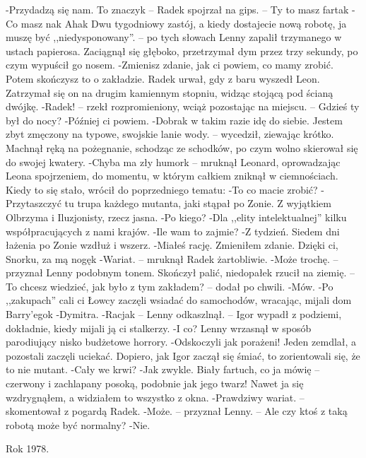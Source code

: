\documentclass[../MAIN.tex]{subfiles}
\begin{document}
-Przydadzą się nam. To znaczy\3k -- Radek spojrzał na gips. -- Ty to masz farta\3k
-Co masz na\3k Aha\3k Dwu tygodniowy zastój, a kiedy dostajecie nową robotę, ja muszę być ,,niedysponowany''. -- po tych słowach Lenny zapalił trzymanego w ustach papierosa. Zaciągnął się głęboko, przetrzymał dym przez trzy sekundy, po czym wypuścił go nosem.
-Zmienisz zdanie, jak ci powiem, co mamy zrobić. Potem skończysz to o zakładzie.
Radek urwał, gdy z baru wyszedł Leon. Zatrzymał się on na drugim kamiennym stopniu, widząc stojącą pod ścianą dwójkę.
-Radek! -- rzekł rozpromieniony, wciąż pozostając na miejscu. -- Gdzieś ty był do nocy?
-Później ci powiem.
-Dobra\3k w takim razie idę do siebie. Jestem zbyt zmęczony na typowe, swojskie lanie wody. -- wycedził, ziewając krótko. Machnął ręką na pożegnanie, schodząc ze schodków, po czym wolno skierował się do swojej kwatery.
-Chyba ma zły humor\3k -- mruknął Leonard, oprowadzając Leona spojrzeniem, do momentu, w którym całkiem zniknął w ciemnościach. Kiedy to się stało, wrócił do poprzedniego tematu:
-To co macie zrobić?
-Przytaszczyć tu trupa każdego mutanta, jaki stąpał po Zonie. Z wyjątkiem Olbrzyma i Iluzjonisty, rzecz jasna.
-Po kiego?
-Dla ,,elity intelektualnej'' kilku współpracujących z nami krajów.
-Ile wam to zajmie?
-Z tydzień. Siedem dni łażenia po Zonie wzdłuż i wszerz.
-Miałeś rację. Zmieniłem zdanie. Dzięki ci, Snorku, za mą nogę\3k
-Wariat. -- mruknął Radek żartobliwie.
-Może trochę. -- przyznał Lenny podobnym tonem. Skończył palić, niedopałek rzucił na ziemię. -- To chcesz wiedzieć, jak było z tym zakładem? -- dodał po chwili.
-Mów.
-Po ,,zakupach'' cali ci Łowcy zaczęli wsiadać do samochodów, wracając, mijali dom Barry’ego\3k
-Dymitra.
-Racja\3k -- Lenny odkaszlnął. -- Igor wypadł z podziemi, dokładnie, kiedy mijali ją ci stalkerzy.
-I co?
Lenny wrzasnął w sposób parodiujący nisko budżetowe horrory.
-Odskoczyli jak porażeni! Jeden zemdlał, a pozostali zaczęli uciekać. Dopiero, jak Igor zaczął się śmiać, to zorientowali się, że to nie mutant.
-Cały we krwi?
-Jak zwykle. Biały fartuch, co ja mówię -- czerwony i zachlapany posoką, podobnie jak jego twarz! Nawet ja się wzdrygnąłem, a widziałem to wszystko z okna.
-Prawdziwy wariat. -- skomentował z pogardą Radek.
-Może. -- przyznał Lenny. -- Ale czy ktoś z taką robotą może być normalny?
-Nie.



Rok 1978.
\end{document}
